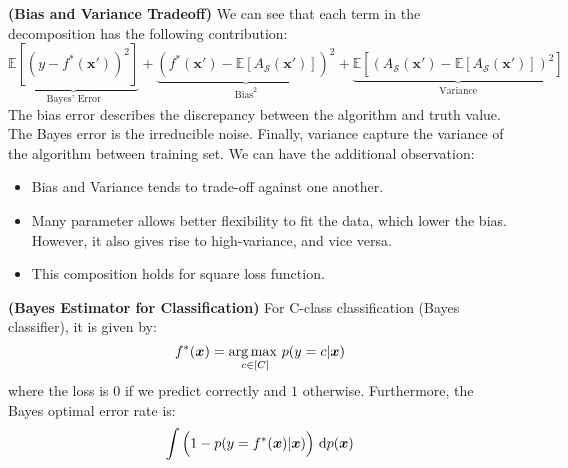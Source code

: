 \begin{remark}{\textbf{(Bias and Variance Tradeoff)}}
    We can see that each term in the decomposition has the following contribution:
    \begin{equation*}
        \underbrace{\mathbb{E}[(y - f^*(\boldsymbol x'))^2]}_{\text{Bayes' Error}} + \underbrace{(f^*(\boldsymbol x') - \mathbb{E}[A_\mathcal{S}(\boldsymbol x')])^2}_{\text{Bias}^2} + \underbrace{\mathbb{E}[(A_\mathcal{S}(\boldsymbol x') - \mathbb{E}[A_\mathcal{S}(\boldsymbol x')])^2]}_\text{Variance}
    \end{equation*}
    The bias error describes the discrepancy between the algorithm and truth value. The Bayes error is the irreducible noise. Finally, variance capture the variance of the algorithm between training set. We can have the additional observation:
    \begin{itemize}
        \item Bias and Variance tends to trade-off against one another. 
        \item Many parameter allows better flexibility to fit the data, which lower the bias. However, it also gives rise to high-variance, and vice versa.
        \item This composition holds for square loss function.
    \end{itemize}
\end{remark}

\begin{definition}{\textbf{(Bayes Estimator for Classification)}}
    For C-class classification (Bayes classifier), it is given by:
    \begin{equation*}
        f^*(\boldsymbol x) = \underset{c \in [C]}{\arg\max \ } p(y = c | \boldsymbol x)
    \end{equation*} 
    where the loss is $0$ if we predict correctly and $1$ otherwise. Furthermore, the Bayes optimal error rate is:
    \begin{equation*}
        \int \Big( 1-p(y = f^*(\boldsymbol x) | \boldsymbol x) \Big)\ \mathrm{d} p(\boldsymbol x)
    \end{equation*}
\end{definition}

